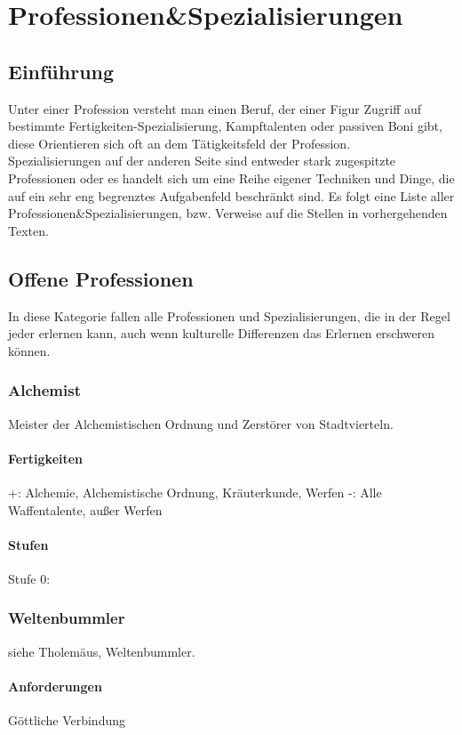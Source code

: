 \documentclass[a4paper,12pt,oneside]{book}
\begin{document}
\part{Professionen\&Spezialisierungen}
\setcounter{chapter}{0}
\chapter{Einführung}
Unter einer Profession versteht man einen Beruf, der einer Figur Zugriff auf bestimmte Fertigkeiten-Spezialisierung, Kampftalenten oder passiven Boni gibt, diese Orientieren sich oft an dem Tätigkeitsfeld der Profession.
\\Spezialisierungen auf der anderen Seite sind entweder stark zugespitzte Professionen oder es handelt sich um eine Reihe eigener Techniken und Dinge, die auf ein sehr eng begrenztes Aufgabenfeld beschränkt sind.
Es folgt eine Liste aller Professionen\&Spezialisierungen, bzw. Verweise auf die Stellen in vorhergehenden Texten.
\chapter{Offene Professionen}
In diese Kategorie fallen alle Professionen und Spezialisierungen, die in der Regel jeder erlernen kann, auch wenn kulturelle Differenzen das Erlernen erschweren können.

\section{Alchemist}
Meister der Alchemistischen Ordnung und Zerstörer von Stadtvierteln.
\subsection{Fertigkeiten}
+: Alchemie, Alchemistische Ordnung, Kräuterkunde, Werfen
-: Alle Waffentalente, außer Werfen
\subsection{Stufen}
\begin{description}
\item[Stufe 0:]
\end{description}

\section{Weltenbummler}
siehe Tholemäus, Weltenbummler.
\subsection{Anforderungen}
Göttliche Verbindung
\end{document}
